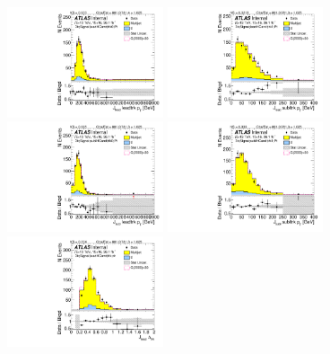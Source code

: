 \begin{figure}[htb!]
\begin{center}
\includegraphics[width=0.41\textwidth,angle=-90]{figures/boosted/Signal/b77_ThreeTag_Signal_leadHCand_trk0_Pt.pdf}
\includegraphics[width=0.41\textwidth,angle=-90]{figures/boosted/Signal/b77_ThreeTag_Signal_leadHCand_trk1_Pt.pdf}\\
\includegraphics[width=0.41\textwidth,angle=-90]{figures/boosted/Signal/b77_ThreeTag_Signal_sublHCand_trk0_Pt.pdf}
\includegraphics[width=0.41\textwidth,angle=-90]{figures/boosted/Signal/b77_ThreeTag_Signal_sublHCand_trk1_Pt.pdf}\\
\includegraphics[width=0.41\textwidth,angle=-90]{figures/boosted/Signal/b77_ThreeTag_Signal_leadHCand_trk_dr.pdf}

\end{center}
\end{figure}
